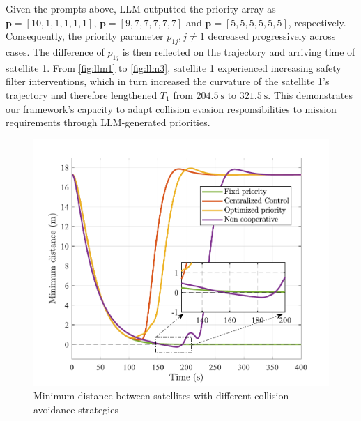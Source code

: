 \documentclass{ifacconf}
\begin{document}
\par Given the prompts above, LLM outputted the priority array as $\mathbf{p} = [10, 1, 1, 1, 1, 1]$, $\mathbf{p} = [9, 7, 7, 7, 7, 7]$ and $\mathbf{p} = [5, 5, 5, 5, 5, 5]$, respectively. 
Consequently, the priority parameter $p_{1j}, j\neq 1$ decreased progressively across cases.
The difference of $p_{1j}$ is then reflected on the trajectory and arriving time of satellite 1. 
From {\figurename} \ref{fig:llm1} to {\figurename} \ref{fig:llm3}, satellite 1 experienced increasing safety filter interventions, which in turn increased the curvature of the satellite 1's trajectory and therefore lengthened $T_1$ from $204.5~\mathrm{s}$ to $321.5~\mathrm{s}$.
This demonstrates our framework's capacity to adapt collision evasion responsibilities to mission requirements through LLM-generated priorities.

\begin{figure}[!t]
   \begin{center}
      \newcommand{\upperClip}{30bp}
      \newcommand{\lowerClip}{8bp}
      \newcommand{\leftClip}{10bp}
      \newcommand{\rightClip}{10bp}
      \includegraphics[width=1.0\linewidth, trim = \leftClip{} \lowerClip{} \rightClip{} \upperClip{}, clip]{minDistance.pdf} 
      \caption{Minimum distance between satellites with different collision avoidance strategies} 
      \label{fig:minDistance}
   \end{center}
\end{figure}
\end{document}
